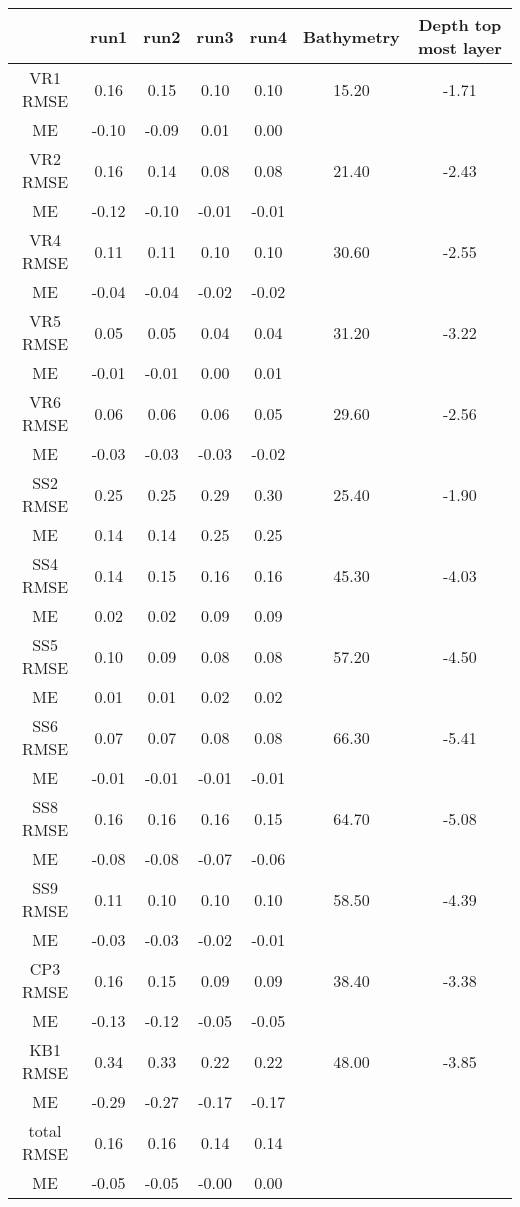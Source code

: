 \begin{center}
\begin{tabular}{|c|c|c|c|c||c|c|}
\hline
 & run1 & run2 & run3 & run4 & Bathymetry & Depth top most layer\\\hline
VR1 RMSE & 0.16 & 0.15 & 0.10 & 0.10 & 15.20 & -1.71\\
      ME & -0.10 & -0.09 & 0.01 & 0.00 & &\\\hline
VR2 RMSE & 0.16 & 0.14 & 0.08 & 0.08 & 21.40 & -2.43\\
      ME & -0.12 & -0.10 & -0.01 & -0.01 & &\\\hline
VR4 RMSE & 0.11 & 0.11 & 0.10 & 0.10 & 30.60 & -2.55\\
      ME & -0.04 & -0.04 & -0.02 & -0.02 & &\\\hline
VR5 RMSE & 0.05 & 0.05 & 0.04 & 0.04 & 31.20 & -3.22\\
      ME & -0.01 & -0.01 & 0.00 & 0.01 & &\\\hline
VR6 RMSE & 0.06 & 0.06 & 0.06 & 0.05 & 29.60 & -2.56\\
      ME & -0.03 & -0.03 & -0.03 & -0.02 & &\\\hline
SS2 RMSE & 0.25 & 0.25 & 0.29 & 0.30 & 25.40 & -1.90\\
      ME & 0.14 & 0.14 & 0.25 & 0.25 & &\\\hline
SS4 RMSE & 0.14 & 0.15 & 0.16 & 0.16 & 45.30 & -4.03\\
      ME & 0.02 & 0.02 & 0.09 & 0.09 & &\\\hline
SS5 RMSE & 0.10 & 0.09 & 0.08 & 0.08 & 57.20 & -4.50\\
      ME & 0.01 & 0.01 & 0.02 & 0.02 & &\\\hline
SS6 RMSE & 0.07 & 0.07 & 0.08 & 0.08 & 66.30 & -5.41\\
      ME & -0.01 & -0.01 & -0.01 & -0.01 & &\\\hline
SS8 RMSE & 0.16 & 0.16 & 0.16 & 0.15 & 64.70 & -5.08\\
      ME & -0.08 & -0.08 & -0.07 & -0.06 & &\\\hline
SS9 RMSE & 0.11 & 0.10 & 0.10 & 0.10 & 58.50 & -4.39\\
      ME & -0.03 & -0.03 & -0.02 & -0.01 & &\\\hline
CP3 RMSE & 0.16 & 0.15 & 0.09 & 0.09 & 38.40 & -3.38\\
      ME & -0.13 & -0.12 & -0.05 & -0.05 & &\\\hline
KB1 RMSE & 0.34 & 0.33 & 0.22 & 0.22 & 48.00 & -3.85\\
      ME & -0.29 & -0.27 & -0.17 & -0.17 & &\\\hline
total RMSE & 0.16 & 0.16 & 0.14 & 0.14 & &\\
      ME & -0.05 & -0.05 & -0.00 & 0.00 & &\\\hline
\end{tabular}
\end{center}
